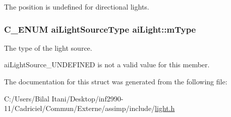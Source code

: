 The position is undefined for directional lights. 
\subsubsection[{\texorpdfstring{m\+Type}{mType}}]{\setlength{\rightskip}{0pt plus 5cm}C\+\_\+\+E\+N\+UM {\bf ai\+Light\+Source\+Type} ai\+Light\+::m\+Type}\hypertarget{structai_light_a4cba1741875dd92724ff55be91c60c2b}{}\label{structai_light_a4cba1741875dd92724ff55be91c60c2b}
The type of the light source.

ai\+Light\+Source\+\_\+\+U\+N\+D\+E\+F\+I\+N\+ED is not a valid value for this member. 

The documentation for this struct was generated from the following file\+:\begin{DoxyCompactItemize}
\item 
C\+:/\+Users/\+Bilal Itani/\+Desktop/inf2990-\/11/\+Cadriciel/\+Commun/\+Externe/assimp/include/\hyperlink{light_8h}{light.\+h}\end{DoxyCompactItemize}
